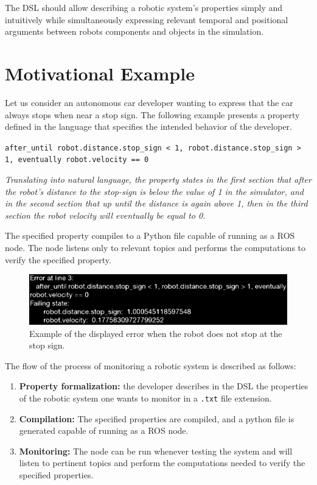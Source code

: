The DSL should allow describing a robotic system's properties simply and intuitively while simultaneously expressing relevant temporal and positional arguments between robots components and objects in the simulation.


\section{Motivational Example}
\label{sec:motivationalexample}

Let us consider an autonomous car developer wanting to express that the car always stops when near a stop sign. The following example presents a property defined in the language that specifies the intended behavior of the developer.

\texttt{after\_until robot.distance.stop\_sign < 1, robot.distance.stop\_sign > 1, eventually robot.velocity == 0}

\textit{Translating into natural language, the property states in the first section that after the robot's distance to the stop-sign is below the value of 1 in the simulator, and in the second section that up until the distance is again above 1, then in the third section the robot velocity will eventually be equal to 0.}

The specified property compiles to a Python file capable of running as a ROS node. The node listens only to relevant topics and performs the computations to verify the specified property.

\begin{figure}
\includegraphics[width=\textwidth]{images/error.eps}
\caption{Example of the displayed error when the robot does not stop at the stop sign.} \label{fig1}
\end{figure}

The flow of the process of monitoring a robotic system is described as follows:

\begin{enumerate}[label=(\roman*)]
    \item \textbf{Property formalization:} the developer describes in the DSL the properties of the robotic system one wants to monitor in a \texttt{.txt} file extension.
    \item \textbf{Compilation:} The specified properties are compiled, and a python file is generated capable of running as a ROS node.
    \item \textbf{Monitoring:} The node can be run whenever testing the system and will listen to pertinent topics and perform the computations needed to verify the specified properties.
\end{enumerate}


